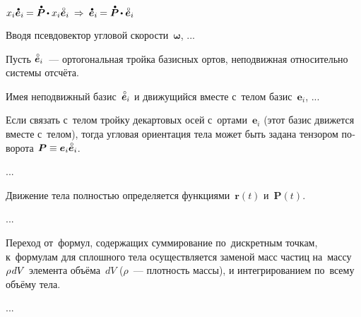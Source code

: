 ${x_i \mathdotabove{\bm{e}}_i \hspace{-0.12ex} = \mathdotabove{\bm{P}} \hspace{-0.16ex} \dotp x_i \mathcircabove{\bm{e}}_i
\:\Rightarrow\:
\mathdotabove{\bm{e}}_i \hspace{-0.12ex} = \mathdotabove{\bm{P}} \hspace{-0.16ex} \dotp \mathcircabove{\bm{e}}_i}$



\foreignlanguage{russian}{Вводя псевдовектор угловой скорости~$\bm{\omega}$, ...}




\foreignlanguage{russian}{Пусть ${\mathcircabove{\bm{e}}_i}$~--- ортогональная тройка базисных ортов, неподвижная относительно системы отсчёта.}

\foreignlanguage{russian}{Имея неподвижный базис~${\mathcircabove{\bm{e}}_i}$ и движущийся вместе с~телом базис~${\bm{e}_i}$, ...}

\foreignlanguage{russian}{Если связать с~телом тройку декартовых осей с~ортами~${\bm{e}_i}$ (этот базис движется вместе с~телом), тогда угловая ориентация тела может быть задана тензором поворота ${\bm{P} \equiv \bm{e}_i \mathcircabove{\bm{e}}_i}$.}

...

\foreignlanguage{russian}{Движение тела полностью определяется функциями~${\bm{r}(t)}$ и~${\bm{P}(t)}$.}

...

\foreignlanguage{russian}{Переход от~формул, содержащих суммирование по~дискретным точкам, к~формулам для сплошного тела осуществляется заменой масс частиц на~массу ${\rho \hspace{0.2ex} dV}$ элемента объёма~$dV$ ($\rho$~--- плотность массы), и интегрированием по~всему объёму тела.}

...



